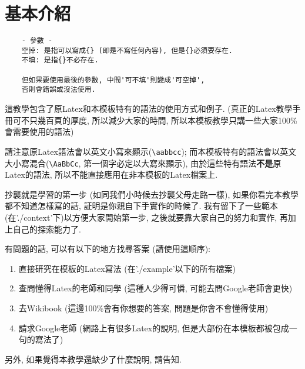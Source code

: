 \section{基本介紹}

  \begin{framed}
  \begin{verbatim}
    - 參數 -
    空掉: 是指可以寫成{} (即是不寫任何內容), 但是{}必須要存在.
    不填: 是指{}不必存在.

    但如果要使用最後的參數, 中間'可不填'則變成'可空掉',
    否則會錯誤或沒法使用.
  \end{verbatim}
  \end{framed}

這教學包含了原Latex和本模板特有的語法的使用方式和例子. (真正的Latex教學手冊可不只幾百頁的厚度, 所以減少大家的時間, 所以本模板教學只講一些大家100\%會需要使用的語法)

請注意原Latex語法會以英文小寫來顯示(\verb|\aabbcc|); 而本模板特有的語法會以英文大小寫混合(\verb|\AaBbCc|, 第一個字必定以大寫來顯示), 由於這些特有語法\textbf{不是}原Latex的語法, 所以不能直接應用在非本模板的Latex檔案上.

抄襲就是學習的第一步 (如同我們小時候去抄襲父母走路一樣), 如果你看完本教學都不知道怎樣寫的話, 証明是你親自下手實作的時候了. 我有留下了一些範本 (在'./context'下)以方便大家開始第一步, 之後就要靠大家自己的努力和實作, 再加上自己的探索能力了.

\newpage
有問題的話, 可以有以下的地方找尋答案 (請使用這順序):
\begin{enumerate}
\item 直接研究在模板的Latex寫法 (在'./example'以下的所有檔案)
\item 查問懂得Latex的老師和同學 (這種人少得可憐, 可能去問Google老師會更快)
\item 去Wikibook (這邊100\%會有你想要的答案, 問題是你會不會懂得使用)
\item 請求Google老師 (網路上有很多Latex的說明, 但是大部份在本模板都被包成一句的寫法了)
\end{enumerate}

另外, 如果覺得本教學還缺少了什麼說明, 請告知.

\EndChapter
